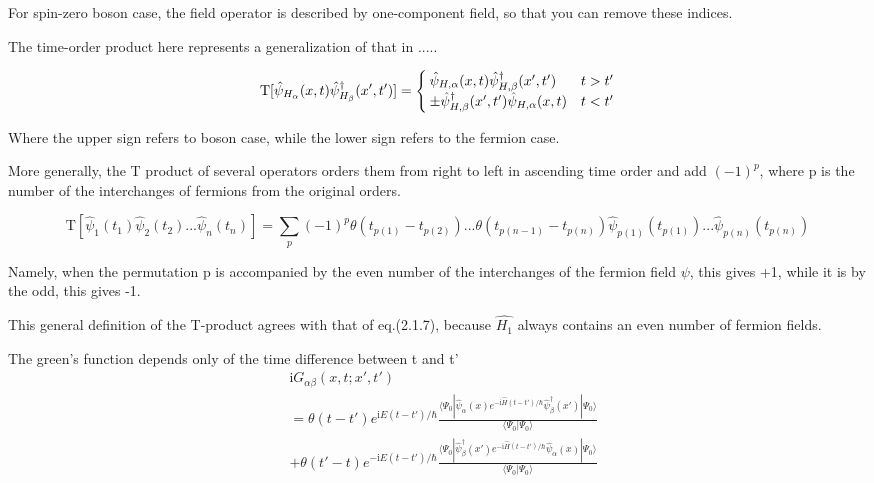 For spin-zero boson case, the field operator is described by one-component field, so that you can remove these indices.

The time-order product here represents a generalization of that in .....

\begin{equation}
\mathrm{T}[\hat \psi_{H_{\alpha}}(x,t)\hat \psi^{\dagger}_{H_{\beta}}(x',t')]=\begin{cases}
\hat \psi_{H,\alpha}(x,t)\hat \psi^{\dagger}_{H,\beta}(x',t') &t>t' \cr  \pm \hat \psi^{\dagger}_{H,\beta}(x',t')\hat \psi_{H,\alpha}(x,t) &t<t'
\end{cases}\nonumber
\end{equation}

Where the upper sign refers to boson case, while the lower sign refers to the fermion case.

More generally, the T product of several operators orders them from right to left in ascending time order and add $(-1)^p$, where p is the number of the interchanges of fermions from the original orders.

\begin{equation}\label{2.3.2}
\mathrm{T}[\hat \psi_1(t_1)\hat \psi_2(t_2)...\hat \psi_n(t_n)]=\sum_{p}(-1)^p\theta(t_{p(1)}-t_{p(2)})...\theta(t_{p(n-1)}-t_{p(n)})\hat \psi_{p(1)}(t_{p(1)})...\hat \psi_{p(n)}(t_{p(n)}) 
\end{equation}

Namely, when the permutation p is accompanied by the even number of the interchanges of the fermion field $\psi$, this gives +1, while it is by the odd, this gives -1.

This general definition of the T-product agrees with that of eq.(2.1.7), because $\hat{H_1}$ always contains an even number of fermion fields.

The green's function depends only of the time difference between t and t'
\begin{align}
&\mathrm{i}G_{\alpha\beta}(x,t;x',t') \nonumber \\
&=\theta(t-t')e^{\mathrm{i}E(t-t')/\hbar}\frac{\langle\Psi_0|\hat \psi_{\alpha}(x)e^{-\mathrm{i}\hat{H}(t-t')/\hbar}\hat \psi^{
\dagger}_{\beta}(x')|\Psi_0\rangle}{\langle\Psi_0|\Psi_0\rangle} \nonumber \\
&+\theta(t'-t)e^{-\mathrm{i}E(t-t')/\hbar}\frac{\langle\Psi_0|\hat \psi^{
\dagger}_{\beta}(x')e^{-\mathrm{i}\hat{H}(t-t')/\hbar}\hat \psi_{\alpha}(x)|\Psi_0\rangle}{\langle\Psi_0|\Psi_0\rangle} \nonumber
\end{align}

